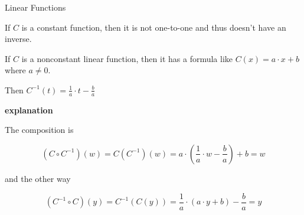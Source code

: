 \documentclass{ximera}
\begin{document}
\begin{example} Linear Functions

If $C$ is a constant function, then it is not one-to-one and thus doesn't have an inverse. 


If $C$ is a nonconstant linear function, then it has a formula like $C(x) = a \cdot x + b$ where $a \ne 0$.


Then $C^{-1}(t) = \frac{1}{a} \cdot t - \frac{b}{a}$


\textbf{\textcolor{red!75!green}{explanation}} 



The composition is 

\[  (C \circ C^{-1})(w) = C(C^{-1})(w) =     a \cdot \left(\frac{1}{a} \cdot w - \frac{b}{a}\right) + b  = w \]


and the other way


\[  (C^{-1} \circ C)(y) = C^{-1}(C(y)) =     \frac{1}{a} \cdot (a \cdot y + b) - \frac{b}{a}  = y \]





\end{example}
\end{document}
